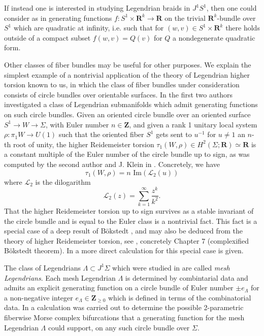 \documentclass{amsart}
\def\bR{\mathbf{R}}
\def\bZ{\mathbf{Z}}
\theoremstyle{definition}
\theoremstyle{remark}
\newtheorem{inductive lemma}[theorem]{Inductive Lemma}
\begin{document}
If instead one is interested in studying Legendrian braids in $J^1S^1$, then one could consider  as in  \cite{T01} generating functions $f:S^1 \times \bR^k \to \bR$ on the trivial $\bR^k$-bundle over $S^1$ which are quadratic at infinity, i.e. such that for $(w,v) \in S^1 \times \bR^k$ there holds outside of a compact subset $f(w,v)=Q(v)$ for $Q$ a nondegenerate quadratic form.

Other classes of fiber bundles may be useful for other purposes. We explain the simplest example of a nontrivial application of the theory of Legendrian higher torsion known to us, in which the class of fiber bundles under consideration consists of circle bundles over orientable surfaces. In \cite{AI} the first two authors investigated a class of Legendrian submanifolds which admit generating functions on such circle bundles. Given an oriented circle bundle over an oriented surface $S^1 \to W \to \Sigma$, with Euler number $n\in \bZ$, and given a rank 1 unitary local system $\rho : \pi_1 W \to U(1)$ such that the oriented fiber $S^1$ gets sent to $u^{-1}$ for $u \neq 1$ an $n$-th root of unity, the higher Reidemeister torsion $\tau_1(W,\rho) \in H^2(\Sigma;\bR) \simeq \bR$ is a constant multiple of the Euler number of the circle bundle up to sign, as was computed by the second author and J. Klein in \cite{IK93a, IK93b}. Concretely, we have
$$ \tau_1(W,\rho) = n \, \,  \text{Im} \left(  \mathcal{L}_2(u)  \right) $$
where $\mathcal{L}_2$ is the dilogarithm
$$ \mathcal{L}_2(z) = \sum_{k=1}^\infty \frac{z^k}{k^2} .$$
That the higher Reidemeister torsion up to sign survives as a stable invariant of the circle bundle and is equal to the Euler class is a nontrivial fact. This fact is a special case of a deep result of B\"okstedt \cite{B82}, and may also be deduced from the theory of higher Reidemeister torsion, see \cite{I02}, concretely Chapter 7 (complexified B\"okstedt theorem). In  \cite{IK93a, IK93b} a more direct calculation for this special case is given. 


The class of Legendrians $\Lambda \subset J^1 \Sigma$ which were studied in \cite{AI} are called {\em mesh Legendrians}. Each mesh Legendrian $\Lambda$ is determined by combintarial data and admits an explicit generating function on a circle bundle of Euler number  $\pm e_\Lambda$ for a non-negative integer $e_\Lambda  \in \bZ_{\geq0}$ which is defined in terms of the combinatorial data. In \cite{AI} a calculation was carried out to determine the possible 2-parametric fiberwise Morse complex bifurcations that a generating function for the mesh Legendrian $\Lambda$ could support, on any such circle bundle over $\Sigma$. 
\end{document}
